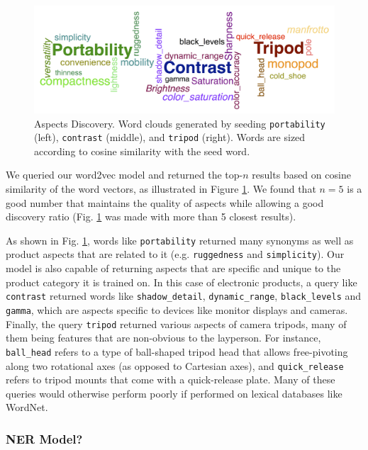 \documentclass{article} %
\begin{document}
\begin{figure}[ht]
\begin{center}
\includegraphics[width=\columnwidth]{Aspects_long.png}
\end{center}
\caption{Aspects Discovery. Word clouds generated by seeding \texttt{portability} (left), \texttt{contrast} (middle), and \texttt{tripod} (right). Words are sized according to cosine similarity with the seed word.}
\label{aspectFig}
\end{figure}

We queried our word2vec model and returned the top-$n$ results based on cosine similarity of the word vectors, as illustrated in Figure \ref{aspectFig}. We found that $n=5$ is a good number that maintains the quality of aspects while allowing a good discovery ratio (Fig. \ref{aspectFig} was made with more than 5 closest results).

As shown in Fig. \ref{aspectFig}, words like \texttt{portability} returned many synonyms as well as product aspects that are related to it (e.g. \texttt{ruggedness} and \texttt{simplicity}). Our model is also capable of returning aspects that are specific and unique to the product category it is trained on. In this case of electronic products, a query like \texttt{contrast} returned words like \texttt{shadow\_detail}, \texttt{dynamic\_range}, \texttt{black\_levels} and \texttt{gamma}, which are aspects specific to devices like monitor displays and cameras. Finally, the query \texttt{tripod} returned various aspects of camera tripods, many of them being features that are non-obvious to the layperson. For instance, \texttt{ball\_head} refers to a type of ball-shaped tripod head that allows free-pivoting along two rotational axes (as opposed to Cartesian axes), and \texttt{quick\_release} refers to tripod mounts that come with a quick-release plate. Many of these queries would otherwise perform poorly if performed on lexical databases like WordNet.


\subsubsection{NER Model?}
\end{document}
